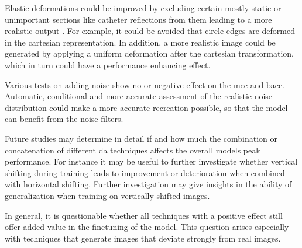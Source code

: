 Elastic deformations could be improved by excluding certain mostly static or unimportant sections like catheter reflections from them leading to a more realistic output \cite{Simard.2003}. For example, it could be avoided that circle edges are deformed in the cartesian representation. In addition, a more realistic image could be generated by applying a uniform deformation after the cartesian transformation, which in turn could have a performance enhancing effect.

Various tests on adding noise show no or negative effect on the \acrshort{mcc} and \acrshort{bacc}. Automatic, conditional and more accurate assessment of the realistic noise distribution could make a more accurate recreation possible, so that the model can benefit from the noise filters. 

Future studies may determine in detail if and how much the combination or concatenation of different \acrshort{da} techniques affects the overall models peak performance. For instance it may be useful to further investigate whether vertical shifting during training leads to improvement or deterioration when combined with horizontal shifting. Further investigation may give insights in the ability of generalization when training on vertically shifted images.

In general, it is questionable whether all techniques with a positive effect still offer added value in the finetuning of the model. This question arises especially with techniques that generate images that deviate strongly from real images.
